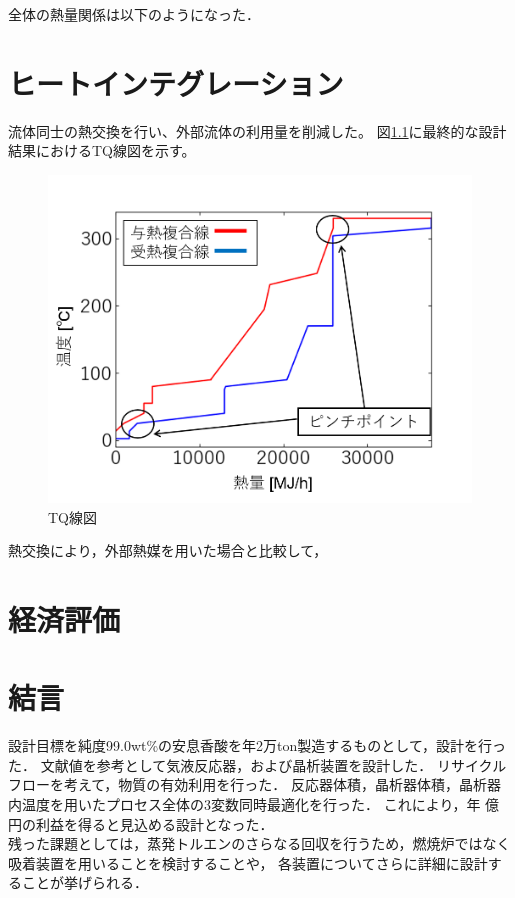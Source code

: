 \documentclass[a4j]{jsreport}
\begin{document}
全体の熱量関係は以下のようになった．

\newpage
\chapter{ヒートインテグレーション}
流体同士の熱交換を行い、外部流体の利用量を削減した。
図\ref{TQ線図}に最終的な設計結果におけるTQ線図を示す。
\begin{figure}[h]
    \label{TQ線図}
    \begin{center}
        \includegraphics[scale=0.7]{TQdiagram.png}
        \caption{TQ線図}
    \end{center}
\end{figure}

熱交換により，外部熱媒を用いた場合と比較して，

\newpage
\chapter{経済評価}

\newpage
\chapter{結言}
設計目標を純度99.0wt\%の安息香酸を年2万ton製造するものとして，設計を行った．
文献値を参考として気液反応器，および晶析装置を設計した．
リサイクルフローを考えて，物質の有効利用を行った．
反応器体積，晶析器体積，晶析器内温度を用いたプロセス全体の3変数同時最適化を行った．
これにより，年 億円の利益を得ると見込める設計となった．\\
残った課題としては，蒸発トルエンのさらなる回収を行うため，燃焼炉ではなく吸着装置を用いることを検討することや，
各装置についてさらに詳細に設計することが挙げられる．
\end{document}
